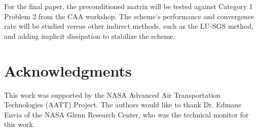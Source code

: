 \documentclass[conf]{new-aiaa}
\begin{document}
For the final paper, the preconditioned matrix will be tested against Category 1 Problem 2 from the CAA workshop. The scheme's performance and convergence rate will be studied versus other indirect methods, such as the LU-SGS method, and adding implicit dissipation to stabilize the scheme. 

\section*{Acknowledgments}
This work was supported by the NASA Advanced Air Transportation Technologies (AATT) Project. The authors would like to thank Dr. Edmane Envia of the NASA Glenn Research Center, who was the technical monitor for this work.



\end{document}
